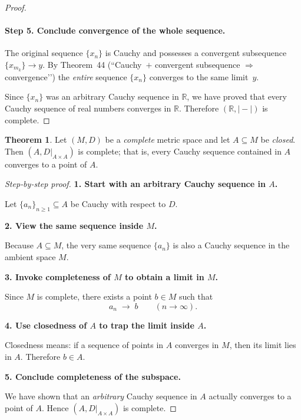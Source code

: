 \documentclass[12pt]{article}
\theoremstyle{definition} %
\newtheorem{theorem}{Theorem}
\theoremstyle{plain} %
\begin{document}
\begin{proof}
  \paragraph{\textbf{Step 5.}  Conclude convergence of the whole sequence.}
  The original sequence $\{x_n\}$ is Cauchy and possesses a convergent
  subsequence $\{x_{m_k}\}\to y$.  By Theorem 44
  (``Cauchy $+$ convergent subsequence $\Rightarrow$ convergence’’)
  the \emph{entire} sequence $\{x_n\}$ converges to the same limit~$y$.

  \medskip
  \noindent
  Since $\{x_n\}$ was an arbitrary Cauchy sequence in $\mathbb R$, we
  have proved that every Cauchy sequence of real numbers converges in
  $\mathbb R$.  Therefore $(\mathbb R,|\!-\!|)$ is complete.
\end{proof}
\begin{theorem}\label{thm:closed_subset_complete}
  Let $(M,D)$ be a \emph{complete} metric space and let
  $A\subseteq M$ be \emph{closed}.  
  Then $(A,D|_{A\times A})$ is complete; that is, every Cauchy sequence
  contained in $A$ converges to a point of $A$.
\end{theorem}

\begin{proof}[Step‑by‑step proof]
  \textbf{1.  Start with an arbitrary Cauchy sequence in $A$.}

  Let $\{a_n\}_{n\ge 1}\subseteq A$ be Cauchy with respect to $D$.

  \medskip
  \textbf{2.  View the same sequence inside $M$.}

  Because $A\subseteq M$, the very same sequence
  $\{a_n\}$ is also a Cauchy sequence in the ambient space $M$.

  \medskip
  \textbf{3.  Invoke completeness of $M$ to obtain a limit in $M$.}

  Since $M$ is complete, there exists a point $b\in M$ such that
  \[
      a_n \;\longrightarrow\; b
      \qquad(n\to\infty).
  \]

  \medskip
  \textbf{4.  Use closedness of $A$ to trap the limit inside $A$.}

  Closedness means: if a sequence of points in $A$ converges in $M$,
  then its limit lies in $A$.  
  Therefore $b\in A$.

  \medskip
  \textbf{5.  Conclude completeness of the subspace.}

  We have shown that an \emph{arbitrary} Cauchy sequence in $A$ actually
  converges to a point of $A$.  Hence $(A,D|_{A\times A})$ is complete.
\end{proof}
\end{document}
